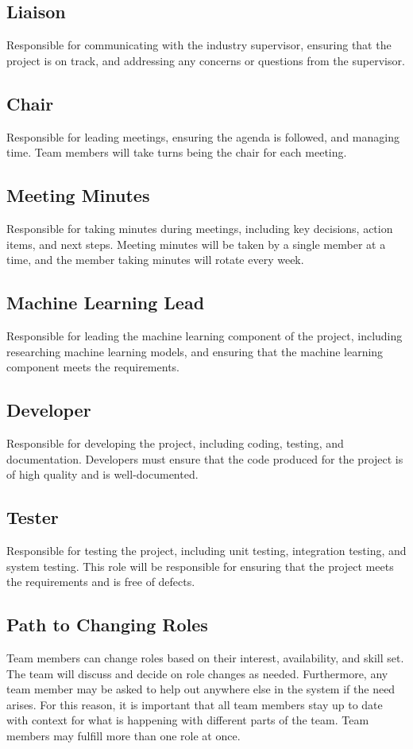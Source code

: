 \documentclass{article}
\begin{document}

\subsection*{Liaison} Responsible for communicating with the industry supervisor, ensuring that the project is on track, and addressing any concerns or questions from the supervisor.   
\subsection*{Chair} Responsible for leading meetings, ensuring the agenda is followed, and managing time. Team members will take turns being the chair for each meeting.
\subsection*{Meeting Minutes} Responsible for taking minutes during meetings, including key decisions, action items, and next steps. Meeting minutes will be taken by a single member at a time, and the member taking minutes will rotate every week.
\subsection*{Machine Learning Lead} Responsible for leading the machine learning component of the project, including researching machine learning models, and ensuring that the machine learning component meets the requirements.
\subsection*{Developer} Responsible for developing the project, including coding, testing, and documentation. Developers must ensure that the code produced for the project is of high quality and is well-documented.
\subsection*{Tester} Responsible for testing the project, including unit testing, integration testing, and system testing. This role will be responsible for ensuring that the project meets the requirements and is free of defects.
\subsection*{Path to Changing Roles} Team members can change roles based on their interest, availability, and skill set. The team will discuss and decide on role changes as needed. Furthermore, any team member may be asked to help out anywhere else in the system if the need arises. For this reason, it is important that all team members stay up to date with context for what is happening with different parts of the team. Team members may fulfill more than one role at once.
\end{document}
